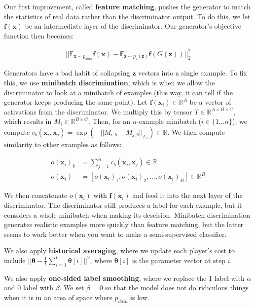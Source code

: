 \documentclass[a4paper]{article}
\begin{document}
Our first improvement, called \textbf{feature matching}, pushes the generator to
match the statistics of real data rather than the discriminator output. To do
this, we let $\bm{f}(\bm{x})$ be an intermediate layer of the discriminator. Our
generator's objective function then becomes:

\begin{align}
  || \mathbb{E}_{\bm{x} \sim p_{data}}\bm{f}({\bm{x}})
  - \mathbb{E}_{\bm{z} \sim p_{z}(\bm{z})}{\bm{f}(G(\bm{z}))}||_2^2
\end{align}

Generators have a bad habit of collapsing $\bm{z}$ vectors into a single
example. To fix this, we use \textbf{minibatch discrimination}, which
is when we allow the discriminator to look at a
minibatch of examples (this way, it can tell if the generator keeps producing
the same point). Let $\bm{f}(\bm{x}_i) \in \mathbb{R}^A$ be a vector of
activations from the discriminator. We multiply this by tensor $T \in
\mathbb{R}^{A \times B \times C}$, which results in $M_i \in \mathbb{R}^{
B \times C}$. Then, for an $n$-example minibatch ($i \in \{1...n\}$), we
compute $c_b(\bm{x}_i, \bm{x}_j) = \exp(-|| M_{i, b} - M_{j, b}||_{L_1})
\in \mathbb{R}$. We then compute similarity to other examples as follows:

\begin{align}
  o(\bm{x}_i)_b &= \sum_{j=1}^{n}{c_b(\bm{x}_i, \bm{x}_j)} \in \mathbb{R} \\
  o(\bm{x}_i) &= [o(\bm{x}_i)_1, o(\bm{x}_i)_2, ..., o(\bm{x}_i)_B] \in
    \mathbb{R}^B
\end{align}

We then concatenate $o(\bm{x}_i)$ with $\bm{f}(\bm{x}_i)$ and feed it into
the next layer of the discriminator. The discriminator still produces a label
for each example, but it considers a whole minibatch when making its descision.
Minibatch discrimination generates realistic examples more quickly than
feature matching, but the latter seems to work better when you want to make
a semi-supervised classifier.

We also apply \textbf{historical averaging}, where we update each player's
cost to include $||
\bm{\theta} - \frac{1}{t} \sum_{i=1}^{t}{\bm{\theta}[i]} ||^2$, where
$\bm{\theta}[i]$ is the parameter vector at step $i$.

We also apply \textbf{one-sided label smoothing}, where we replace the 1 label
with $\alpha$ and 0 label with $\beta$. We set $\beta = 0$ so that the model
does not do ridiculous things when it is in an area of space where $p_{data}$
is low.
\end{document}
